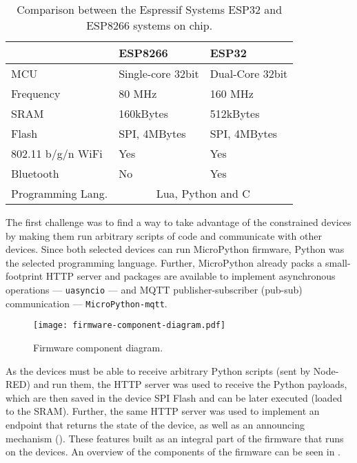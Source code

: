\begin{table}[]
\centering
\caption{Comparison between the Espressif Systems ESP32 and ESP8266 systems on chip.}
\begin{tabular}{@{}lll@{}}
\toprule
                   & \textbf{ESP8266}                   & \textbf{ESP32}                       \\ \midrule
MCU                & Single-core 32bit         & Dual-Core 32bit \\
Frequency          & 80 MHz                    & 160 MHz                     \\
SRAM               & 160kBytes                 & 512kBytes                   \\
Flash              & SPI, 4MBytes             & SPI, 4MBytes               \\
802.11 b/g/n WiFi  & Yes                       & Yes                         \\
Bluetooth          & No                        & Yes                         \\
Programming Lang.  & \multicolumn{2}{c}{Lua, Python and C} \\ \bottomrule
\end{tabular}
\label{tab:esps}
\end{table}

The first challenge was to find a way to take advantage of the constrained devices by making them run arbitrary scripts of code and communicate with other devices. Since both selected devices can run MicroPython firmware, Python was the selected programming language. Further, MicroPython already packs a small-footprint HTTP server and packages are available to implement asynchronous operations --- \ie \texttt{uasyncio} --- and MQTT publisher-subscriber (\viz pub-sub) communication --- \ie \texttt{MicroPython-mqtt}.

\begin{figure}[h]
    \centering
    \texttt{[image: firmware-component-diagram.pdf]}
    \caption{Firmware component diagram.}
    \label{fig:firmware_component_diagram}
\end{figure}

As the devices must be able to receive arbitrary Python scripts (sent by Node-RED) and run them, the HTTP server was used to receive the Python payloads, which are then saved in the device SPI Flash and can be later executed (loaded to the SRAM). Further, the same HTTP server was used to implement an endpoint that returns the state of the device, as well as an announcing mechanism (\cf {}). These features built as an integral part of the firmware that runs on the devices. An overview of the components of the firmware can be seen in .

